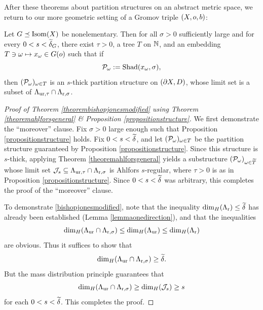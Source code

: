 After these theorems about partition structures on an abstract metric space, we return to our more geometric setting of a Gromov triple $(X,o,b)$:

\begin{proposition}
\label{propositionstructure}
Let $G\preceq\operatorname{Isom}(X)$ be nonelementary. Then for all $\sigma > 0$ sufficiently large and for every $0 < s < \widetilde\delta_G$, there exist $\tau > 0$, a tree $T$ on $\N$, and an embedding $T\ni\omega\mapsto x_\omega\in G(o)$ such that if 
\[
\mathcal P_\omega := \operatorname{Shad}(x_\omega,\sigma),
\]
then $(\mathcal P_\omega)_{\omega\in T}$ is an $s$-thick partition structure on $(\partial X,D)$, whose limit set is a subset of $\Lambda_{\mathrm{ur},\tau}\cap\Lambda_{\mathrm r,\sigma}$.\end{proposition}

\begin{proof}[Proof of Theorem \ref{theorembishopjonesmodified} using Theorem \ref{theoremahlforsgeneral} \& Proposition \ref{propositionstructure}]
\hspace{0 in}

\noindent We first demonstrate the ``moreover'' clause. Fix $\sigma > 0$ large enough such that Proposition \ref{propositionstructure} holds. Fix $0 < s < \widetilde\delta$, and let $(\mathcal P_\omega)_{\omega\in T}$ be the partition structure guaranteed by Proposition \ref{propositionstructure}. Since this structure is $s$-thick, applying Theorem \ref{theoremahlforsgeneral} yields a substructure $(\mathcal P_\omega)_{\omega\in \widetilde T}$ whose limit set $\mathcal J_s\subseteq\Lambda_{\mathrm{ur},\tau}\cap\Lambda_{\mathrm r,\sigma}$ is Ahlfors $s$-regular, where $\tau > 0$ is as in Proposition \ref{propositionstructure}. Since $0 < s < \widetilde\delta$ was arbitrary, this completes the proof of the ``moreover'' clause.

To demonstrate \eqref{bishopjonesmodified}, note that the inequality ${\dim_H}(\Lambda_{\mathrm r})\leq\widetilde\delta$ has already been established (Lemma \ref{lemmaonedirection}), and that the inequalities 
\[
{\dim_H}(\Lambda_{\mathrm{ur}}\cap\Lambda_{\mathrm r,\sigma}) \leq {\dim_H}(\Lambda_{\mathrm{ur}}) \leq {\dim_H}(\Lambda_{\mathrm r})\] 
are obvious. Thus it suffices to show that 
\[
{\dim_H}(\Lambda_{\mathrm{ur}}\cap\Lambda_{\mathrm r,\sigma})\geq\widetilde\delta.
\] 
But the mass distribution principle guarantees that 
\[
{\dim_H}(\Lambda_{\mathrm{ur}}\cap\Lambda_{\mathrm r,\sigma})\geq {\dim_H}(\mathcal J_s)\geq s
\] 
for each $0 < s < \widetilde\delta$. This completes the proof.
\end{proof}


